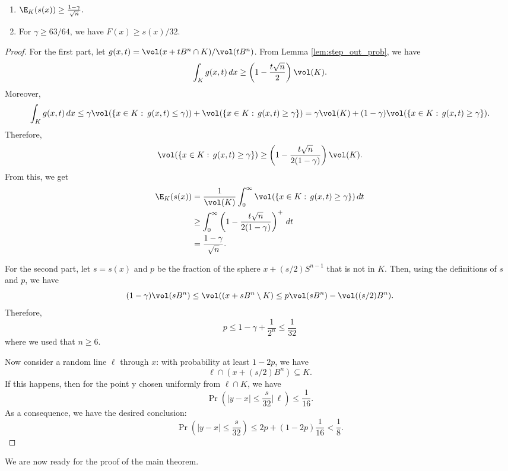 \begin{enumerate}
\item $\E_{K}(s(x))\ge\frac{1-\gamma}{\sqrt{n}}.$
\item For $\gamma\ge63/64$, we have $F(x)\ge s(x)/32.$
\end{enumerate}
\begin{proof}
For the first part, let $g(x,t)=\vol(x+tB^{n}\cap K)/\vol(tB^{n})$.
From Lemma \ref{lem:step_out_prob}, we have
\[
\int_{K}g(x,t)\,dx\ge\left(1-\frac{t\sqrt{n}}{2}\right)\vol(K).
\]
Moreover, 
\[
\int_{K}g(x,t)\,dx\le\gamma\vol(\{x\in K:\:g(x,t)\le\gamma))+\vol(\{x\in K:\,g(x,t)\ge\gamma\})=\gamma\vol(K)+(1-\gamma)\vol(\{x\in K:\,g(x,t)\ge\gamma\}).
\]
Therefore, 
\[
\vol(\{x\in K:\,g(x,t)\ge\gamma\})\ge\left(1-\frac{t\sqrt{n}}{2(1-\gamma)}\right)\vol(K).
\]
From this, we get 
\begin{align*}
\E_{K}(s(x)) & =\frac{1}{\vol(K)}\int_{0}^{\infty}\vol(\{x\in K:\,g(x,t)\ge\gamma\})\,dt\\
 & \ge\int_{0}^{\infty}\left(1-\frac{t\sqrt{n}}{2(1-\gamma)}\right)^{+}\,dt\\
 & =\frac{1-\gamma}{\sqrt{n}}.
\end{align*}

For the second part, let $s=s(x)$ and $p$ be the fraction of the
sphere $x+(s/2)S^{n-1}$ that is not in $K$. Then, using the definitions
of $s$ and $p$, we have
\[
(1-\gamma)\vol(sB^{n})\le\vol((x+sB^{n}\setminus K)\le p\vol(sB^{n})-\vol((s/2)B^{n}).
\]
Therefore,
\[
p\le1-\gamma+\frac{1}{2^{n}}\le\frac{1}{32}
\]
where we used that $n\ge6$. 

Now consider a random line $\ell$ through $x$: with probability
at least $1-2p$, we have 
\[
\ell\cap(x+(s/2)B^{n})\subseteq K.
\]
If this happens, then for the point y chosen uniformly from $\ell\cap K$,
we have 
\[
\Pr\left(|y-x|\le\frac{s}{32}\big|\,\ell\right)\le\frac{1}{16}.
\]
As a consequence, we have the desired conclusion: 
\[
\Pr\left(\left|y-x\right|\le\frac{s}{32}\right)\le2p+(1-2p)\frac{1}{16}<\frac{1}{8}.
\]
\end{proof}
We are now ready for the proof of the main theorem.
